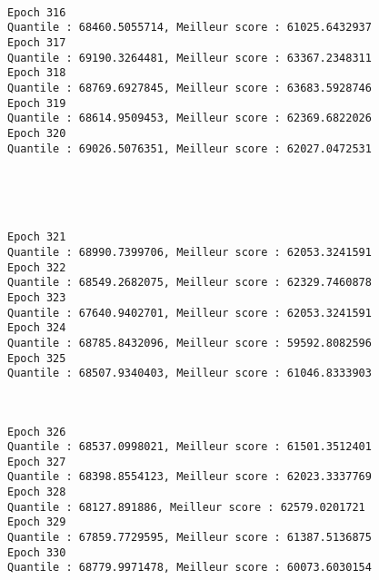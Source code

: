 \documentclass[11pt]{article}
\begin{document}
    \begin{center}
    \end{center}
    { \hspace*{\fill} \\}
    
    \begin{Verbatim}[commandchars=\\\{\}]
Epoch 316
Quantile : 68460.5055714, Meilleur score : 61025.6432937
Epoch 317
Quantile : 69190.3264481, Meilleur score : 63367.2348311
Epoch 318
Quantile : 68769.6927845, Meilleur score : 63683.5928746
Epoch 319
Quantile : 68614.9509453, Meilleur score : 62369.6822026
Epoch 320
Quantile : 69026.5076351, Meilleur score : 62027.0472531

    \end{Verbatim}

    \begin{center}
    \end{center}
    { \hspace*{\fill} \\}
    
    \begin{center}
    \end{center}
    { \hspace*{\fill} \\}
    
    \begin{Verbatim}[commandchars=\\\{\}]
Epoch 321
Quantile : 68990.7399706, Meilleur score : 62053.3241591
Epoch 322
Quantile : 68549.2682075, Meilleur score : 62329.7460878
Epoch 323
Quantile : 67640.9402701, Meilleur score : 62053.3241591
Epoch 324
Quantile : 68785.8432096, Meilleur score : 59592.8082596
Epoch 325
Quantile : 68507.9340403, Meilleur score : 61046.8333903

    \end{Verbatim}

    \begin{center}
    \end{center}
    { \hspace*{\fill} \\}
    
    \begin{Verbatim}[commandchars=\\\{\}]
Epoch 326
Quantile : 68537.0998021, Meilleur score : 61501.3512401
Epoch 327
Quantile : 68398.8554123, Meilleur score : 62023.3337769
Epoch 328
Quantile : 68127.891886, Meilleur score : 62579.0201721
Epoch 329
Quantile : 67859.7729595, Meilleur score : 61387.5136875
Epoch 330
Quantile : 68779.9971478, Meilleur score : 60073.6030154

    \end{Verbatim}
\end{document}
